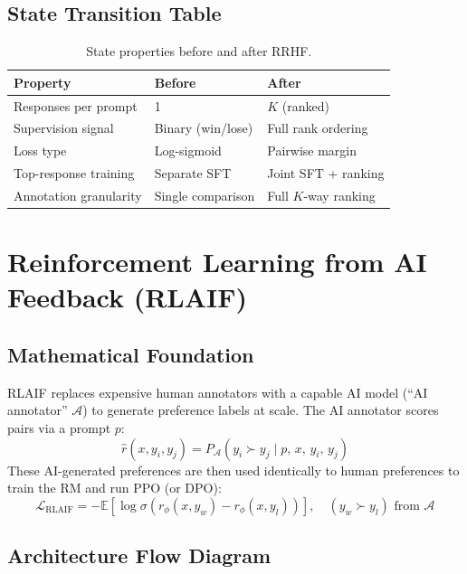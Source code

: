\documentclass{article}
\begin{document}
\subsection{State Transition Table}
\begin{table}[h]\centering
\begin{tabular}{lll}\toprule
\textbf{Property} & \textbf{Before} & \textbf{After}\\\midrule
Responses per prompt & 1 & $K$ (ranked)\\
Supervision signal & Binary (win/lose) & Full rank ordering\\
Loss type & Log-sigmoid & Pairwise margin\\
Top-response training & Separate SFT & Joint SFT + ranking\\
Annotation granularity & Single comparison & Full $K$-way ranking\\\bottomrule
\end{tabular}
\caption{State properties before and after RRHF.}
\end{table}

\newpage
\section{Reinforcement Learning from AI Feedback (RLAIF)}

\subsection{Mathematical Foundation}
RLAIF replaces expensive human annotators with a capable AI model (``AI annotator'' $\mathcal{A}$) to generate preference labels at scale. The AI annotator scores pairs via a prompt $p$:
\begin{equation}
  \hat{r}(x,y_i,y_j) = P_\mathcal{A}(y_i \succ y_j \mid p,\, x,\, y_i,\, y_j)
\end{equation}
These AI-generated preferences are then used identically to human preferences to train the RM and run PPO (or DPO):
\begin{equation}
  \mathcal{L}_{\text{RLAIF}} = -\mathbb{E}\!\left[\log\sigma\!\left(r_\phi(x,y_w) - r_\phi(x,y_l)\right)\right], \quad (y_w \succ y_l) \text{ from } \mathcal{A}
\end{equation}

\subsection{Architecture Flow Diagram}
\end{document}
